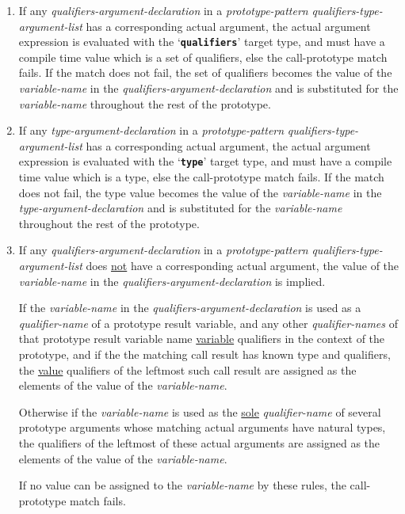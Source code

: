 \documentclass[12pt]{article}
\newcommand{\TT}[1]{{\tt \bfseries #1}}
\begin{document}
\begin{enumerate}
\item
If any {\em qualifiers-argument-declaration} in a {\em prototype-pattern}
{\em qualifiers-type-argument-list} has a corresponding
actual argument, the actual argument expression
is evaluated with the `\TT{qualifiers}' target type,
and must have a compile time value which is a set of qualifiers, else
the call-prototype match fails.  If the match does not fail,
the set of qualifiers becomes the value of the {\em variable-name}
in the {\em qualifiers-argument-declaration} and
is substituted for the {\em variable-name} throughout the rest of the
prototype.

\item
If any {\em type-argument-declaration} in a {\em prototype-pattern}
{\em qualifiers-type-argument-list} has a corresponding
actual argument, the actual argument expression
is evaluated with the `\TT{type}' target type,
and must have a compile time value which is a type, else
the call-prototype match fails.  If the match does not fail,
the type value becomes the value of the {\em variable-name}
in the {\em type-argument-declaration} and
is substituted for the {\em variable-name} throughout the rest of the
prototype.

\item
If any {\em qualifiers-argument-declaration} in a {\em prototype-pattern}
{\em qualifiers-type-argument-list} does \underline{not} have
a corresponding actual argument, the value of the
{\em variable-name} in the {\em qual\-i\-fiers-argument-declaration}
is implied.

If the {\em variable-name} in the {\em qualifiers-argument-declaration}
is used as a {\em qualifier-name}
of a prototype result variable, and any other {\em qualifier-names}
of that prototype result variable name \underline{variable}
qualifiers in the context of the prototype, and if the
the matching call result has known type and qualifiers,
the \underline{value} qualifiers of the leftmost such call result
are assigned as the elements of the
value of the {\em variable-name}.

Otherwise if the {\em variable-name}
is used as the \underline{sole} {\em qualifier-name}
of several prototype arguments whose matching
actual arguments have natural types, the qualifiers of the leftmost
of these actual arguments are assigned as the elements of the
value of the {\em variable-name}.

If no value can be assigned to the {\em variable-name} by these rules,
the call-prototype match fails.


\end{enumerate}
\end{document}
